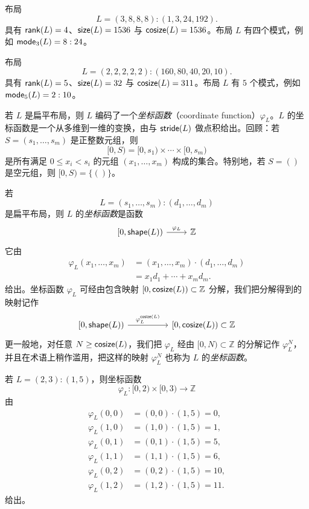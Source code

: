 \begin{example}
布局
\[
L = (3,8,8,8) : (1,3,24,192).
\]
具有 $\mathsf{rank}(L) = 4$、$\mathsf{size}(L) = 1536$ 与 $\mathsf{cosize}(L) = 1536$。布局 $L$ 有四个模式，例如 $\mathsf{mode}_3(L) = 8:24$。
\end{example}

\begin{example}
布局
\[
L = (2,2,2,2,2) : (160,80,40,20,10).
\]
具有 $\mathsf{rank}(L) = 5$、$\mathsf{size}(L) = 32$ 与 $\mathsf{cosize}(L) = 311$。布局 $L$ 有 $5$ 个模式，例如 $\mathsf{mode}_5(L) = 2:10$。
\end{example}

若 $L$ 是扁平布局，则 $L$ 编码了一个{\it 坐标函数}（coordinate function）$\varphi_L$。$L$ 的坐标函数是一个从多维到一维的变换，由与 $\mathsf{stride}(L)$ 做点积给出。回顾：若 $S = (s_1,\dots,s_m)$ 是正整数元组，则
\[
[0,S) = [0,s_1) \times \cdots \times [0,s_m)
\]
是所有满足 $0 \leq x_i < s_i$ 的元组 $(x_1,\dots,x_m)$ 构成的集合。特别地，若 $S = ()$ 是空元组，则 $[0,S) = \{()\}$。

\begin{construction}[坐标函数]\label{constructionofcoordinatefunctions}
若
\[
L = (s_1,\dots,s_m):(d_1,\dots,d_m)
\]
是扁平布局，则 $L$ 的{\it 坐标函数}是函数
\[\begin{tikzcd}
{[}0,\shape(L){)} \ar[r,"\varphi_L"] &  \mathbb{Z}
\end{tikzcd} \]
它由
\begin{align*}
\varphi_L(x_1,\dots,x_m) & = (x_1,\dots,x_m) \cdot (d_1,\dots,d_m)\\
& = x_1 d_1 + \cdots + x_m d_m.
\end{align*}
给出。坐标函数 $\varphi_L$ 可经由包含映射 $[0,\mathsf{cosize}(L)) \subset \mathbb{Z}$ 分解，我们把分解得到的映射记作
    \[\begin{tikzcd} {[}0,\shape(L){)} \ar[rr,"\varphi_L^{\cosize(L)}"] & & {[}0,\cosize(L){)}\subset \mathbb{Z}
    \end{tikzcd} \]
    更一般地，对任意 $N \geq \mathsf{cosize}(L)$，我们把 $\varphi_L$ 经由 $[0,N) \subset \mathbb{Z}$ 的分解记作 $\varphi_L^N$，并且在术语上稍作滥用，把这样的映射 $\varphi_L^N$ 也称为 $L$ 的{\it 坐标函数}。
\end{construction}

\begin{example}\label{layoutfunctionexample1coord1}
    若 $L = (2,3):(1,5)$，则坐标函数
    \[
    \varphi_L:[0,2) \times [0,3) \to \mathbb{Z}
    \]
    由
    \begin{align*}
    \varphi_L(0,0) & = (0,0) \cdot (1,5) = 0,\\
    \varphi_L(1,0) & = (1,0) \cdot (1,5) = 1,\\
    \varphi_L(0,1) & = (0,1) \cdot (1,5) = 5,\\
    \varphi_L(1,1) & = (1,1) \cdot (1,5) = 6,\\
    \varphi_L(0,2) & = (0,2) \cdot (1,5) = 10,\\
    \varphi_L(1,2) & = (1,2) \cdot (1,5) = 11.
    \end{align*}
    给出。
\end{example}

